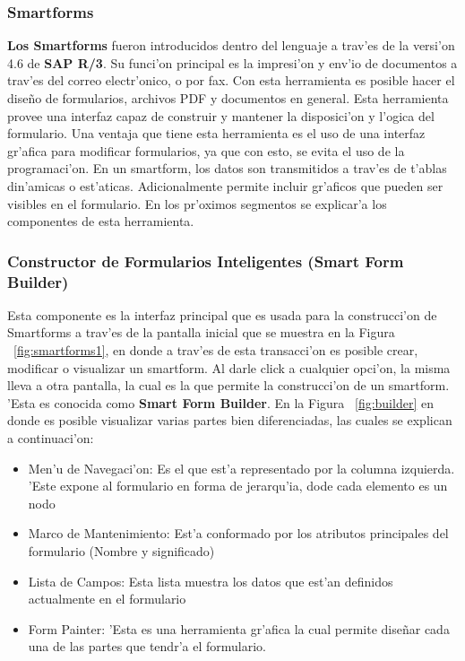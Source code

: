 \subsubsection{Smartforms}
	\textbf{Los Smartforms} fueron introducidos dentro del lenguaje a trav'es de la versi'on 4.6 de \textbf{SAP R/3}. Su funci'on principal es la impresi'on y env'io de documentos a trav'es del correo electr'onico, o por fax. 
	Con esta herramienta es posible hacer el dise\~no de formularios, archivos PDF y documentos en general. 
	Esta herramienta provee una interfaz capaz de construir y mantener la disposici'on y l'ogica del formulario.
	Una ventaja que tiene esta herramienta es el uso  de una interfaz gr'afica para modificar formularios, ya que con esto, se evita el uso de la programaci'on. 
	En un smartform, los datos son transmitidos a trav'es de t'ablas din'amicas o est'aticas. Adicionalmente permite incluir gr'aficos que pueden ser visibles en el formulario. En los pr'oximos segmentos se explicar'a los componentes de esta herramienta.
\subsubsection{Constructor de Formularios Inteligentes (Smart Form Builder)}
	Esta componente es la interfaz principal que es usada para la construcci'on de Smartforms a trav'es de la pantalla inicial que se muestra en la Figura ~\ref{fig:smartforms1}, en donde a trav'es de esta transacci'on es posible crear, modificar o visualizar un smartform. Al darle click a cualquier opci'on, la misma lleva a otra pantalla, la cual es la que permite la construcci'on de un smartform. 'Esta es conocida como \textbf{Smart Form Builder}. En la Figura ~\ref{fig:builder} en donde es posible visualizar varias partes bien diferenciadas, las cuales se explican a continuaci'on:
\begin{itemize}
\item Men'u de Navegaci'on: Es el que est'a representado por la columna izquierda. 'Este expone al formulario en forma de jerarqu'ia, dode cada elemento es un nodo
\item Marco de Mantenimiento: Est'a conformado por los atributos principales del formulario (Nombre y significado)
\item Lista de Campos: Esta lista muestra los datos que est'an definidos actualmente en el formulario
\item Form Painter: 'Esta es una herramienta gr'afica la cual permite dise\~nar cada una de las partes que tendr'a el formulario.
\end{itemize}
